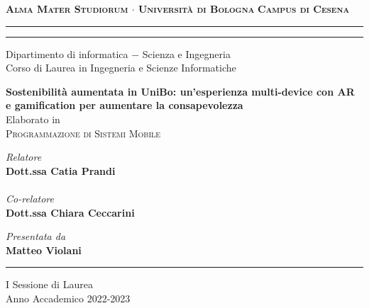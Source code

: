 \begin{titlepage}
    \begin{center}
        {\Large
            \textbf{
                \textsc{Alma Mater Studiorum $\cdot$ Università di Bologna}
            }
        }
        {\large
            \textbf{
                \textsc{Campus di Cesena}
            }
        }
        \rule[0.1cm]{16cm}{0.3mm}
        \rule[0.5cm]{16cm}{0.7mm}
        {\Large
            Dipartimento di informatica $-$ Scienza e Ingegneria \\
        }
        \vspace*{4mm}
        {\Large 
            Corso di Laurea in Ingegneria e Scienze Informatiche
        }
        \vspace*{35mm} %
        \begin{center}
            {\LARGE
                \textbf{
                    Sostenibilità aumentata in UniBo: un'esperienza multi-device con AR e gamification per aumentare la consapevolezza
                }
            } \\
            \vspace*{20mm} %
            {\Large Elaborato in} \\
            \vspace*{3mm}
            {\Large
                \textsc{Programmazione di Sistemi Mobile}
            }
        \end{center}
        \vspace*{40mm}
        \begin{minipage}[t]{0.47\textwidth}
            {\large
                \textit{Relatore} \\
                \textbf{Dott.ssa Catia Prandi} \\
                \vspace*{1mm} \\
                \textit{Co-relatore} \\
                \textbf{Dott.ssa Chiara Ceccarini} \\
            }
        \end{minipage}
        \begin{minipage}[t]{0.47\textwidth}\raggedleft
            {\large
                \textit{Presentata da} \\
                \textbf{Matteo Violani}
            }
        \end{minipage}
    \end{center}
    \begin{center}
        \vspace*{28mm}
        \rule[0.1cm]{16cm}{0.3mm}
    \end{center}
    \begin{center}
        {\large
            I Sessione di Laurea
        } \\
        \vspace*{2mm}
        {\large
            Anno Accademico 2022-2023
        }
    \end{center}
\end{titlepage}
\restoregeometry